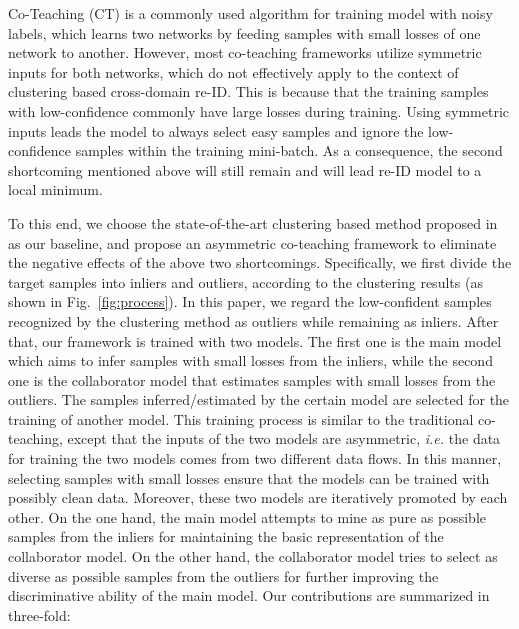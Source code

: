 \documentclass[letterpaper]{article} \usepackage{aaai20}  \usepackage{times}  \usepackage{helvet} \usepackage{courier}  \usepackage[hyphens]{url}  \usepackage{graphicx} \urlstyle{rm} \def\UrlFont{\rm}  \usepackage{graphicx}  \frenchspacing  \setlength{\pdfpagewidth}{8.5in}  \setlength{\pdfpageheight}{11in}  \usepackage{color}
\begin{document}
Co-Teaching (CT) \cite{han2018co} is a commonly used algorithm for training model with noisy labels, which learns two networks by feeding samples with small losses of one network to another. However, most co-teaching frameworks utilize symmetric inputs for both networks, which do not effectively apply to the context of clustering based cross-domain re-ID. This is because that the training samples with low-confidence commonly have large losses during training. Using symmetric inputs leads the model to always select easy samples and ignore the low-confidence samples within the training mini-batch. As a consequence, the second shortcoming mentioned above will still remain and will lead re-ID model to a local minimum. 

To this end, we choose the state-of-the-art clustering based method proposed in \cite{song2018unsupervised} as our baseline, and propose an asymmetric co-teaching framework to eliminate the negative effects of the above two shortcomings. Specifically, we first divide the target samples into inliers and outliers, according to the clustering results (as shown in Fig.~\ref{fig:process}). In this paper, we regard the low-confident samples recognized by the clustering method as outliers while remaining as inliers. After that, our framework is trained with two models. The first one is the main model which aims to infer samples with small losses from the inliers, while the second one is the collaborator model that estimates samples with small losses from the outliers. The samples inferred/estimated by the certain model are selected for the training of another model. This training process is similar to the traditional co-teaching, except that the inputs of the two models are asymmetric, \textit{i.e.} the data for training the two models comes from two different data flows. In this manner, selecting samples with small losses ensure that the models can be trained with possibly clean data. Moreover, these two models are iteratively promoted by each other. On the one hand, the main model attempts to mine as pure as possible samples from the inliers for maintaining the basic representation of the collaborator model. On the other hand, the collaborator model tries to select as diverse as possible samples from the outliers for further improving the discriminative ability of the main model. Our contributions are summarized in three-fold:
\end{document}
